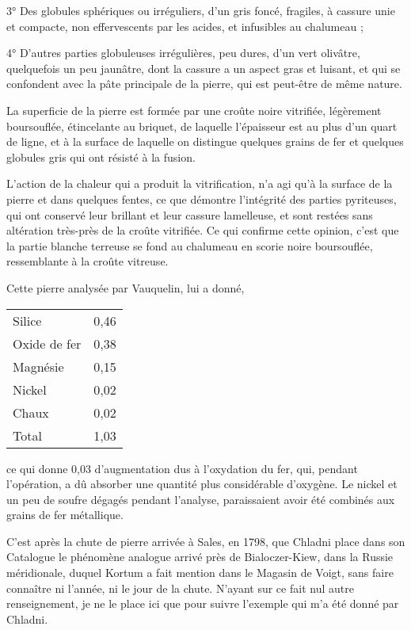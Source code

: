 \documentclass[a4paper, 12pt, oneside, french]{article}
\begin{document}
3° Des globules sphériques ou irréguliers, d'un gris foncé, fragiles, à cassure unie et compacte, non effervescents par les acides, et infusibles au chalumeau ;

4° D'autres parties globuleuses irrégulières, peu dures, d'un vert olivâtre, quelquefois un peu jaunâtre, dont la cassure a un aspect gras et luisant, et qui se confondent avec la pâte principale de la pierre, qui est peut-être de même nature.

La superficie de la pierre est formée par une croûte noire vitrifiée, légèrement boursouflée, étincelante au briquet, de laquelle l'épaisseur est au plus d'un quart de ligne, et à la surface de laquelle on distingue quelques grains de fer et quelques globules gris qui ont résisté à la fusion.

L'action de la chaleur qui a produit la vitrification, n'a agi qu'à la surface de la pierre et dans quelques fentes, ce que démontre l'intégrité des parties pyriteuses, qui ont conservé leur brillant et leur cassure lamelleuse, et sont restées sans altération très-près de la croûte vitrifiée. Ce qui confirme cette opinion, c'est que la partie blanche terreuse se fond au chalumeau en scorie noire boursouflée, ressemblante à la croûte vitreuse.

Cette pierre analysée par Vauquelin, lui a donné,
\begin{table}[H]
    \centering
    \Fontauri
    \large
    \begin{tabular}{l r}
        Silice & 0,46 \\
        Oxide de fer & 0,38 \\
        Magnésie & 0,15 \\
        Nickel & 0,02 \\
        Chaux & 0,02 \\ \hline
        Total & 1,03 \\
    \end{tabular}
\end{table}
ce qui donne 0,03 d'augmentation dus à l'oxydation du fer, qui, pendant l'opération, a dû absorber une quantité plus considérable d'oxygène. Le nickel et un peu de soufre dégagés pendant l'analyse, paraissaient avoir été combinés aux grains de fer métallique.

C'est après la chute de pierre arrivée à Sales, en 1798, que Chladni place dans son Catalogue le phénomène analogue arrivé près de Bialoczer-Kiew, dans la Russie méridionale, duquel Kortum a fait mention dans le Magasin de Voigt, sans faire connaître ni l'année, ni le jour de la chute. N'ayant sur ce fait nul autre renseignement, je ne le place ici que pour suivre l'exemple qui m'a été donné par Chladni.
\end{document}
